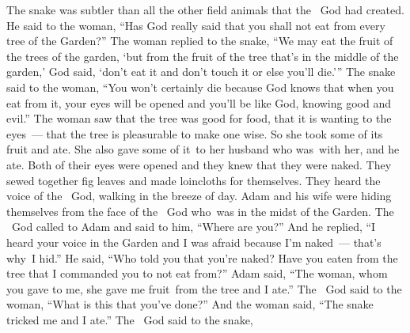 
\begin{inparaenum}
   The snake was subtler than all the other field animals that the \lord\ God had created. He said to the woman, ``Has God really said that you shall not eat from every tree of the Garden?''%
   The woman replied to the snake, ``We may eat the fruit of the trees of the garden,%
   `but from the fruit of the tree that's in the middle of the garden,' God said, `don't eat it and don't touch it or else you'll die.'\thinspace''%
   The snake said to the woman, ``You won't certainly die%
   because God knows that when you eat from it, your eyes will be opened and you'll be like God, knowing good and evil.''%
   The woman saw that the tree was good for food, that it is wanting to the eyes~--- that the tree is pleasurable to make one wise. So she took some of its fruit and ate. She also gave some of it\understood{}\ to her husband who was\understood{}\ with her, and he ate.%
   Both of their eyes were opened and they knew that they were naked. They sewed together fig leaves and made loincloths for themselves.%
   They heard the voice of the \lord\ God, walking in the breeze of day. Adam and his wife were hiding themselves from the face of the \lord\ God who\understood{}\ was in the midst of the Garden.%
   The \lord\ God called to Adam and said to him, ``Where are you?''%
   And he replied, ``I heard your voice in the Garden and I was afraid because I'm naked~--- that's why\understood{}\ I hid.''%
   He said, ``Who told you that you're naked? Have you eaten from the tree that I commanded you to not eat from?''%
   Adam said, ``The woman, whom you gave to me, she gave me fruit\understood{}\ from the tree and I ate.''%
   The \lord\ God said to the woman, ``What is this that you've done?'' And the woman said, ``The snake tricked me and I ate.''%
   The \lord\ God said to the snake,\smallskip%


\end{inparaenum}
